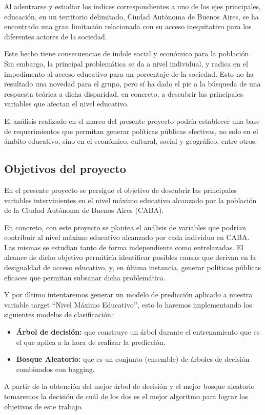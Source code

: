 \documentclass[a4paper]{article}
\begin{document}
        Al adentrarse y estudiar los índices correspondientes a uno de los ejes principales, educación, en un territorio delimitado, Ciudad Autónoma de Buenos Aires, se ha encontrado una gran limitación relacionada con su acceso inequitativo para los diferentes actores de la sociedad. 

        Este hecho tiene consecuencias de índole social y económico para la población. Sin embargo, la principal problemática se da a nivel individual, y radica en el impedimento al acceso educativo para un porcentaje de la sociedad. Esto no ha resultado una novedad para el grupo, pero sí ha dado el pie a la búsqueda de una respuesta teórica a dicha disparidad, en concreto, a descubrir las principales variables que afectan el nivel educativo.

        El análisis realizado en el marco del presente proyecto podría establecer una base de requerimientos que permitan generar políticas públicas efectivas, no solo en el ámbito educativo, sino en el económico, cultural, social y geográfico, entre otros.

    \subsection{Objetivos del proyecto}

        En el presente proyecto se persigue el objetivo de descubrir las principales variables intervinientes en el nivel máximo educativo alcanzado por la población de la Ciudad Autónoma de Buenos Aires (CABA).
        
        En concreto, con este proyecto se plantea el análisis de variables que podrían contribuir al nivel máximo educativo alcanzado por cada individuo en CABA. Las mismas se estudian tanto de forma independiente como entrelazadas. El alcance de dicho objetivo permitiría identificar posibles causas que derivan en la desigualdad de acceso educativo, y, en última instancia, generar políticas públicas eficaces que permitan subsanar dicha problemática. 

        Y por último intentaremos generar un modelo de predicción aplicado a nuestra variable target ``Nivel Máximo Educativo’’, esto lo haremos implementando los siguientes modelos de clasificación:
        \begin{itemize}
            \item \textbf{Árbol de decisión:} que construye un árbol durante el entrenamiento que es el que aplica a la hora de realizar la predicción.
            \item \textbf{Bosque Aleatorio:} que es un conjunto (ensemble) de árboles de decisión combinados con bagging.
        \end{itemize}
        A partir de la obtención del mejor árbol de decisión y el mejor bosque aleatorio tomaremos la decisión de cuál de los dos es el mejor algoritmo para lograr los objetivos de este trabajo.
\end{document}
